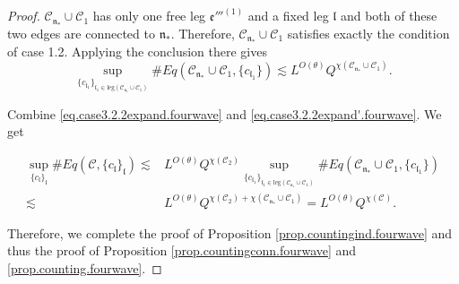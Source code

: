 \begin{proof}
    $\mathcal{C}_{\mathfrak{n}_*}\cup \mathcal{C}_1$ has only one free leg $\mathfrak{e}'''^{(1)}$ and a fixed leg $\mathfrak{l}$ and both of these two edges are connected to $\mathfrak{n}_*$. Therefore, $\mathcal{C}_{\mathfrak{n}_*}\cup \mathcal{C}_1$ satisfies exactly the condition of case 1.2. Applying the conclusion there gives
    \begin{equation}\label{eq.case3.2.2expand'.fourwave}
     \sup_{\{c_{\mathfrak{l}_1}\}_{\mathfrak{l}_1\in \text{leg}(\mathcal{C}_{\mathfrak{n}_*}\cup \mathcal{C}_1)} } \# Eq(\mathcal{C}_{\mathfrak{n}_*}\cup \mathcal{C}_1,\{c_{\mathfrak{l}_1}\})\lesssim L^{O(\theta)} Q^{\chi(\mathcal{C}_{\mathfrak{n}_*}\cup \mathcal{C}_1)}.
    \end{equation}
    
    Combine \eqref{eq.case3.2.2expand.fourwave} and \eqref{eq.case3.2.2expand'.fourwave}. We get 
    
    \begin{equation}
    \begin{split}
     \sup_{\{c_{\mathfrak{l}}\}_{\mathfrak{l}}}\#Eq(\mathcal{C},\{c_{\mathfrak{l}}\}_{\mathfrak{l}})
     \lesssim& L^{O(\theta)} Q^{\chi(\mathcal{C}_2)}\sup_{\{c_{\mathfrak{l}_1}\}_{\mathfrak{l}_1\in \text{leg}(\mathcal{C}_{\mathfrak{n}_*}\cup \mathcal{C}_1)} } \# Eq(\mathcal{C}_{\mathfrak{n}_*}\cup \mathcal{C}_1,\{c_{\mathfrak{l}_1}\})
     \\
     \lesssim& L^{O(\theta)} Q^{\chi(\mathcal{C}_2)+\chi(\mathcal{C}_{\mathfrak{n}_*}\cup \mathcal{C}_1)}=L^{O(\theta)} Q^{\chi(\mathcal{C})}.
    \end{split}
    \end{equation}
    
    Therefore, we complete the proof of Proposition \ref{prop.countingind.fourwave} and thus the proof of Proposition \ref{prop.countingconn.fourwave} and \ref{prop.counting.fourwave}.
    
    \end{proof}









